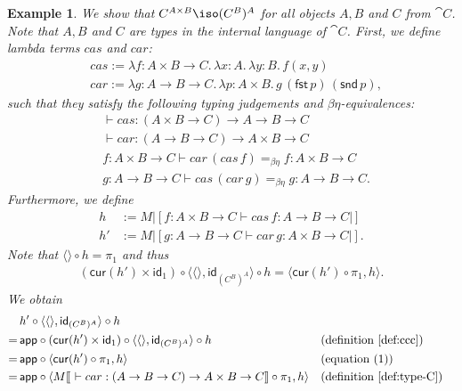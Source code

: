 \documentclass{article}
\newtheorem{exmpl}[defn]{Example}
\newcommand{\term}{1}
\newcommand{\id}{\mathsf{id}}
\begin{document}
\begin{exmpl}
    We show that $C^{A \times B} \iso (C^B)^A$ for all objects $A, B$ and $C$ from $\cat{C}$.
    Note that $A, B$ and $C$ are types in the internal language of $\cat{C}$.
    First, we  define lambda terms $cas$ and $car$:
    \begin{align*}
        & cas := \lambda f: A \times B \to C.\,\lambda x: A.\,\lambda y: B.\,f(x, y) \\
        & car := \lambda g: A \to B \to C.\,\lambda p: A \times B.\,g\,(\mathsf{fst}\,p)\,(\mathsf{snd}\,p),
    \end{align*}
    such that they satisfy the following typing judgements and $\beta\eta$-equivalences:
    \begin{align*}
        & \vdash cas: (A \times B \to C) \to A \to B \to C \\
        & \vdash car: (A \to B \to C) \to A \times B \to C\\
        & f: A \times B \to C \vdash car\, (cas\, f) =_{\beta\eta} f : A \times B \to C \\
        & g: A \to B \to C \vdash cas\, (car\, g) =_{\beta\eta} g : A \to B \to C.
    \end{align*}
    Furthermore, we define
    \begin{align*}
        h & := M|[f: A \times B \to C \vdash cas\,f: A \to B \to C|] \\
        h' & := M|[g: A \to B \to C \vdash car\,g: A \times B \to C|].
    \end{align*}
    Note that $\langle\rangle \circ h = \pi_1$ and thus
    \begin{align*}
        (\mathsf{cur}(h') \times \id_{\term}) \circ \langle \langle\rangle, \id_{(C^B)^A} \rangle \circ h = \langle \mathsf{cur}(h') \circ \pi_1, h \rangle. \tag{1}
    \end{align*}
    We obtain
    \begin{align*}
        & h' \circ \langle\langle\rangle, \id_{(C^B)^A}\rangle \circ h \\
        = \,& \mathsf{app} \circ (\mathsf{cur}(h') \times \id_\term) \circ \langle\langle\rangle, \id_{(C^B)^A}\rangle \circ h && (\text{definition}~\ref{def:ccc})\\
        = \,& \mathsf{app} \circ \langle \mathsf{cur}(h') \circ \pi_1, h \rangle && (\text{equation}~(1))\\
        = \,& \mathsf{app} \circ \langle M|[\ \vdash car: (A \to B \to C) \to A \times B \to C|] \circ \pi_1, h \rangle && (\text{definition}~\ref{def:type-C})\\

\end{align*}
\end{exmpl}
\end{document}
